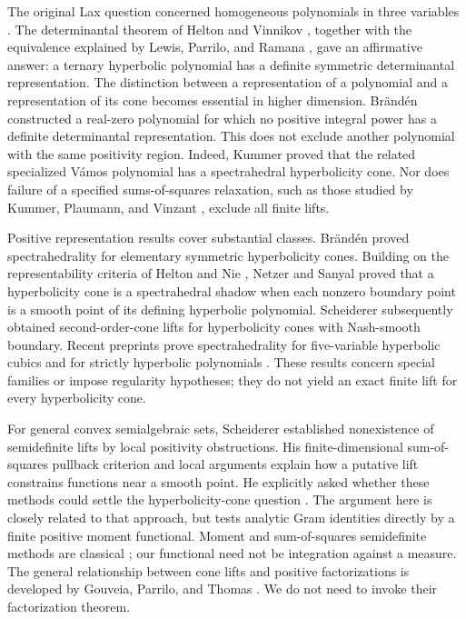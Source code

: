 The original Lax question concerned homogeneous polynomials in three
variables \cite{Lax1958}. The determinantal theorem of Helton and
Vinnikov \cite{HeltonVinnikov2007}, together with the equivalence
explained by Lewis, Parrilo, and Ramana \cite{LewisParriloRamana2005},
gave an affirmative answer: a ternary hyperbolic polynomial has a
definite symmetric determinantal representation. The distinction between
a representation of a polynomial and a representation of its cone
becomes essential in higher dimension. Br\"and\'en
\cite{Branden2011} constructed a real-zero polynomial for which no
positive integral power has a definite determinantal representation.
This does not exclude another polynomial with the same positivity
region. Indeed, Kummer \cite{Kummer2016} proved that the related
specialized V\'amos polynomial has a spectrahedral hyperbolicity cone.
Nor does failure of a specified sums-of-squares relaxation, such as
those studied by Kummer, Plaumann, and Vinzant
\cite{KummerPlaumannVinzant2015}, exclude all finite lifts.

Positive representation results cover substantial classes.
Br\"and\'en \cite{Branden2014} proved spectrahedrality for elementary
symmetric hyperbolicity cones. Building on the representability
criteria of Helton and Nie \cite{HeltonNie2010}, Netzer and Sanyal
\cite[Theorem~1.1]{NetzerSanyal2015} proved that a hyperbolicity cone
is a spectrahedral shadow when each nonzero boundary point is a smooth
point of its defining hyperbolic polynomial. Scheiderer
\cite{Scheiderer2025} subsequently obtained second-order-cone lifts
for hyperbolicity cones with Nash-smooth boundary. Recent preprints
prove spectrahedrality for
five-variable hyperbolic cubics \cite{Netzer2026} and for strictly
hyperbolic polynomials \cite{KummerNetzer2026}. These results concern
special families or impose regularity hypotheses; they do not yield
an exact finite lift for every hyperbolicity cone.

For general convex semialgebraic sets, Scheiderer
\cite{Scheiderer2018} established nonexistence of semidefinite lifts
by local positivity obstructions. His finite-dimensional
sum-of-squares pullback criterion and local arguments explain how a
putative lift constrains functions near a smooth point. He explicitly
asked whether these methods could settle the hyperbolicity-cone
question \cite[Section~5.4]{Scheiderer2018}. The argument here is
closely related to that approach, but tests analytic Gram identities
directly by a finite positive moment functional. Moment and
sum-of-squares semidefinite methods are classical
\cite{Lasserre2001}; our functional need not be integration against a
measure. The general relationship between cone lifts and positive
factorizations is developed by Gouveia, Parrilo, and Thomas
\cite{GouveiaParriloThomas2013}. We do not need to invoke their
factorization theorem.

